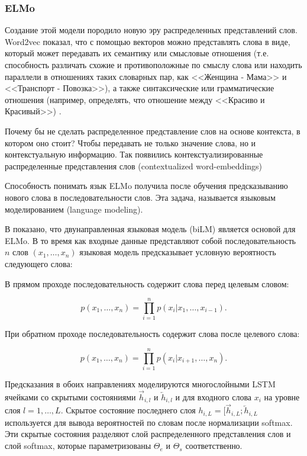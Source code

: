 
\subsubsection{ELMo}

Создание этой модели породило новую эру распределенных представлений слов. Word2vec показал, что с помощью векторов можно представлять слова в виде, который может передавать их семантику или смысловые отношения (т.е. способность различать схожие и противоположные по смыслу слова или находить параллели в отношениях таких словарных пар, как <<Женщина - Мама>> и <<Транспорт - Повозка>>), а также синтаксические или грамматические отношения (например, определять, что отношение между <<Красиво и Красивый>>) \cite{elmoru}.

\bigskip
Почему бы не сделать распределенное представление слов на основе контекста, в котором оно стоит? Чтобы передавать не только значение слова, но и контекстуальную информацию. Так появились контекстуализированные распределенные представления слов (contextualized word-embeddings)

\bigskip
Способность понимать язык ELMo получила после обучения предсказыванию нового слова в последовательности слов. Эта задача, называется языковым моделированием (language modeling).

\bigskip
В \cite{elmoen} показано, что двунаправленная языковая модель (biLM) является основой для ELMo. В то время как входные данные представляют собой последовательность $n$ слов $(x_1, \ldots, x_n)$ языковая модель предсказывает условную вероятность следующего слова:

\bigskip
В прямом проходе последовательность содержит слова перед целевым словом:

\begin{equation*}
  p(x_1, \ldots, x_n) = \prod_{i=1}^n p(x_i| x_1, \ldots, x_{i-1}).
\end{equation*}

\bigskip
При обратном проходе последовательность содержит слова после целевого слова:

\begin{equation*}
  p(x_1, \ldots, x_n) = \prod_{i=1}^n p(x_i| x_{i+1}, \ldots, x_n).
 \end{equation*}

\bigskip
Предсказания в обоих направлениях моделируются многослойными LSTM ячейками со скрытыми состояниями $\overrightarrow{h}_{i,l}$ и $\overleftarrow{h}_{i,l}$ и для входного слова $x_i$ на уровне слоя $l = 1, \ldots, L$. Скрытое состояние последнего слоя $h_{i,L} = [\overrightarrow{h}_{i,L}; \overleftarrow{h}_{i,L}$ используется для вывода вероятностей по словам после нормализации softmax. Эти скрытые состояния разделяют слой распределенного представления слов и слой softmax, которые параметризованы $\Theta_e$ и $\Theta_s$ соответственно.


